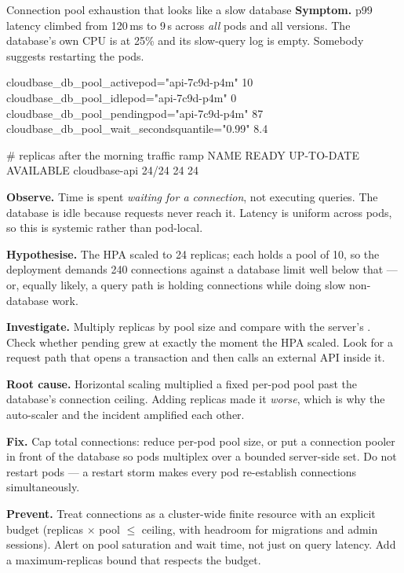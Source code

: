 \begin{debuglab}{Connection pool exhaustion that looks like a slow database}
\textbf{Symptom.} p99 latency climbed from 120\,ms to 9\,s across \emph{all} pods and all versions. The database's own CPU is at 25\% and its slow-query log is empty. Somebody suggests restarting the pods.

\begin{outbox}
cloudbase_db_pool_active{pod="api-7c9d-p4m"}   10
cloudbase_db_pool_idle{pod="api-7c9d-p4m"}      0
cloudbase_db_pool_pending{pod="api-7c9d-p4m"}  87
cloudbase_db_pool_wait_seconds{quantile="0.99"} 8.4

# replicas after the morning traffic ramp
NAME                READY   UP-TO-DATE   AVAILABLE
cloudbase-api       24/24   24           24
\end{outbox}

\begin{tickcheck}
  \item \textbf{Observe.} Time is spent \emph{waiting for a connection}, not executing queries. The database is idle because requests never reach it. Latency is uniform across pods, so this is systemic rather than pod-local.
  \item \textbf{Hypothesise.} The HPA scaled to 24 replicas; each holds a pool of 10, so the deployment demands 240 connections against a database limit well below that --- or, equally likely, a query path is holding connections while doing slow non-database work.
  \item \textbf{Investigate.} Multiply replicas by pool size and compare with the server's . Check whether pending grew at exactly the moment the HPA scaled. Look for a request path that opens a transaction and then calls an external API inside it.
  \item \textbf{Root cause.} Horizontal scaling multiplied a fixed per-pod pool past the database's connection ceiling. Adding replicas made it \emph{worse}, which is why the auto-scaler and the incident amplified each other.
  \item \textbf{Fix.} Cap total connections: reduce per-pod pool size, or put a connection pooler in front of the database so pods multiplex over a bounded server-side set. Do not restart pods --- a restart storm makes every pod re-establish connections simultaneously.
  \item \textbf{Prevent.} Treat connections as a cluster-wide finite resource with an explicit budget (replicas $\times$ pool $\le$ ceiling, with headroom for migrations and admin sessions). Alert on pool saturation and wait time, not just on query latency. Add a maximum-replicas bound that respects the budget.
\end{tickcheck}
\end{debuglab}

